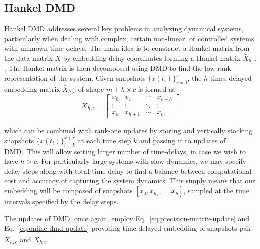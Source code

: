 \subsection{Hankel DMD}\label{sec:hankel-dmd}
Hankel DMD addresses several key problems in analyzing dynamical systems, particularly when dealing with complex, certain non-linear, or controlled systems with unknown time delays. The main idea is to construct a Hankel matrix from the data matrix \(X\) by embedding delay coordinates forming a Hankel matrix \(\bar{X}_{h, c}\). The Hankel matrix is then decomposed using DMD to find the low-rank representation of the system. Given snapshots \({\{x(t_i)\}}^c_{i=0}\), the \(h\)-times delayed embedding matrix \(\bar{X}_{h, c}\) of shape \(m + h \times c\) is formed as
\begin{equation}\label{eq:hankel}
	\bar{X}_{h, c} = \begin{bmatrix}
		x_0    & x_1       & \cdots & x_{c - h} \\
		\vdots & \vdots    & \ddots & \vdots    \\
		x_{h}  & x_{h + 1} & \cdots & x_{c},
	\end{bmatrix}
\end{equation}

which can be combined with rank-one updates by storing and vertically stacking snapshots \({\{x(t_i)\}}^{k+c}_{i=k}\) at each time step \(k\) and passing it to updates of DMD.~This will allow setting larger number of time-delays, in case we wish to have \(h > c\). For particularly large systems with slow dynamics, we may specify delay steps along with total time-delay to find a balance between computational cost and accuracy of capturing the system dynamics. This simply means that our embedding will be composed of snapshots \( [x_0, x_{h_d}, \ldots, x_h] \), sampled at the time intervals specified by the delay steps.

The updates of DMD, once again, employ Eq.~\eqref{eq:precision-matrix-update} and Eq.~\eqref{eq:online-dmd-update}  providing time delayed embedding of snapshots pair \(\bar{X}_{h, c}\) and \(\bar{X}^\prime_{h, c}\).
